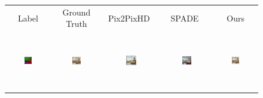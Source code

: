 \addtolength{\tabcolsep}{-4.5pt}    
\bgroup
\def\arraystretch{0.5}%
\begin{figure}[]
\begin{tabular} {cc|cc|c}
 Label & Ground Truth & Pix2PixHD~\cite{wang2018pix2pixHD} &  SPADE~\cite{park2019SPADE} & Ours\\
\includegraphics[width=0.1932\textwidth,height=0.96in]{Images/Rec/ADE/label/ADE_val_00000146.png} & \includegraphics[width=0.1932\textwidth,height=0.96in]{Images/Rec/ADE/gt/ADE_val_00000146.jpg} &
\includegraphics[width=0.1932\textwidth,height=0.96in]{Images/Rec/ADE/pix2pixhd/ADE_val_00000146.jpg} &   \includegraphics[width=0.1932\textwidth,height=0.96in]{Images/Rec/ADE/spade/ADE_val_00000146.jpg} &  \includegraphics[width=0.1932\textwidth,height=0.96in]{Images/Rec/ADE/ours/ADE_val_00000146.png} \\




\end{tabular}
\end{figure}
